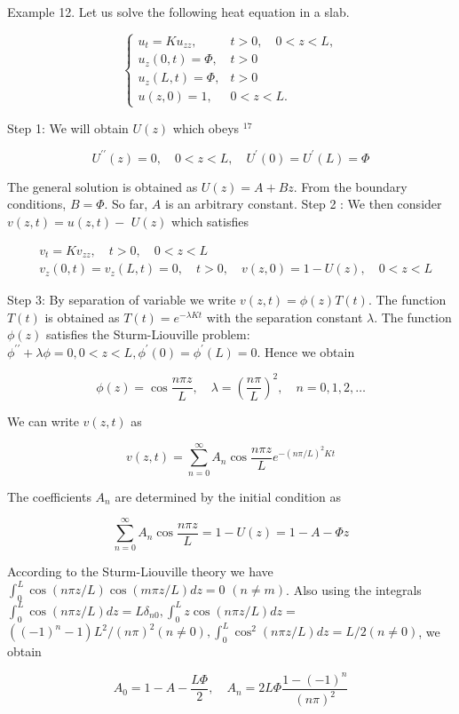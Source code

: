 Example 12. Let us solve the following heat equation in a slab.

$$
\left\{\begin{aligned}
u_t=K u_{z z}, & t>0, \quad 0<z<L, \\
u_z(0, t)=\Phi, & t>0 \\
u_z(L, t)=\Phi, & t>0 \\
u(z, 0)=1, & 0<z<L .
\end{aligned}\right.
$$


Step 1: We will obtain $U(z)$ which obeys ${ }^{17}$

$$
U^{\prime \prime}(z)=0, \quad 0<z<L, \quad U^{\prime}(0)=U^{\prime}(L)=\Phi
$$


The general solution is obtained as $U(z)=A+B z$. From the boundary conditions, $B=\Phi$. So far, $A$ is an arbitrary constant. Step 2 : We then consider $v(z, t)=u(z, t)-$ $U(z)$ which satisfies

$$
\begin{aligned}
& v_t=K v_{z z}, \quad t>0, \quad 0<z<L \\
& v_z(0, t)=v_z(L, t)=0, \quad t>0, \quad v(z, 0)=1-U(z), \quad 0<z<L
\end{aligned}
$$

Step 3: By separation of variable we write $v(z, t)=\phi(z) T(t)$. The function $T(t)$ is obtained as $T(t)=e^{-\lambda K t}$ with the separation constant $\lambda$. The function $\phi(z)$ satisfies the Sturm-Liouville problem: $\phi^{\prime \prime}+\lambda \phi=0,0<z<L, \phi^{\prime}(0)=\phi^{\prime}(L)=0$. Hence we obtain

$$
\phi(z)=\cos \frac{n \pi z}{L}, \quad \lambda=\left(\frac{n \pi}{L}\right)^2, \quad n=0,1,2, \ldots
$$


We can write $v(z, t)$ as

$$
v(z, t)=\sum_{n=0}^{\infty} A_n \cos \frac{n \pi z}{L} e^{-(n \pi / L)^2 K t}
$$


The coefficients $A_n$ are determined by the initial condition as

$$
\sum_{n=0}^{\infty} A_n \cos \frac{n \pi z}{L}=1-U(z)=1-A-\Phi z
$$


According to the Sturm-Liouville theory we have $\int_0^L \cos (n \pi z / L) \cos (m \pi z / L) d z=0$ $(n \neq m)$. Also using the integrals $\int_0^L \cos (n \pi z / L) d z=L \delta_{n 0}, \int_0^L z \cos (n \pi z / L) d z=$ $\left((-1)^n-1\right) L^2 /(n \pi)^2(n \neq 0), \int_0^L \cos ^2(n \pi z / L) d z=L / 2(n \neq 0)$, we obtain

$$
A_0=1-A-\frac{L \Phi}{2}, \quad A_n=2 L \Phi \frac{1-(-1)^n}{(n \pi)^2}
$$


